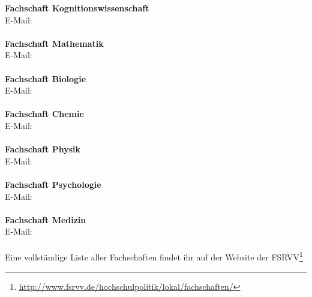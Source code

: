 \textbf{Fachschaft Kognitionswissenschaft}\\
E-Mail: \\
\\
\textbf{Fachschaft Mathematik}\\
E-Mail: \\
\\
\textbf{Fachschaft Biologie}\\
E-Mail: \\
\\
\textbf{Fachschaft Chemie}\\
E-Mail: \\
\\
\textbf{Fachschaft Physik}\\
E-Mail: \\
\\
\textbf{Fachschaft Psychologie}\\
E-Mail: \\
\\
\textbf{Fachschaft Medizin}\\
E-Mail: \\
\\
Eine vollständige Liste aller Fachschaften findet ihr auf der Website der FSRVV\footnote{\url{http://www.fsrvv.de/hochschulpolitik/lokal/fachschaften/}}	%

\vfill
